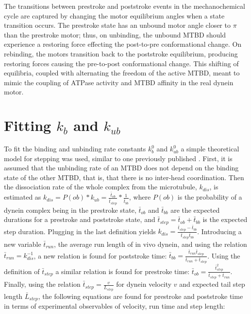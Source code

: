 \documentclass[9pt,twocolumn,twoside]{article}
\begin{document}
The transitions between prestroke and poststroke events in the mechanochemical cycle \cite{cianfrocco} are captured by changing the motor equilibrium angles when a state transition occurs. The prestroke state has an unbound motor angle closer to $\pi$ than the prestroke motor\cite{burgess-paper}; thus, on unbinding, the unbound MTBD should experience a restoring force effecting the post-to-pre conformational change. On rebinding, the motors transition back to the poststroke equilibrium, producing restoring forces causing the pre-to-post conformational change. This shifting of equilibria, coupled with alternating the freedom of the active MTBD, meant to mimic the coupling of ATPase activity and MTBD affinity in the real dynein motor.

\section*{Fitting $k_b$ and $k_{ub}$}
To fit the binding and unbinding rate constants $k^0_b$ and $k^0_{ub}$ a simple theoretical model for stepping was used, similar to one previously published \cite{myosindutyratio}. First, it is assumed that the unbinding rate of an MTBD does not depend on the binding state of the other MTBD, that is, that there is no inter-head coordination. Then the dissociation rate of the whole complex from the microtubule, $k_{dis}$, is estimated as $k_{dis} = P(ob)*k_{ub} = \frac{\bar{t}_{ob}}{\bar{t}_{step}} * \frac{1}{\bar{t}_{bb}}$, where $P(ob)$ is the probability of a dynein complex being in the prestroke state, $\bar{t}_{ob}$ and $\bar{t}_{bb}$ are the expected durations for a prestroke and poststroke state, and $\bar{t}_{step} = \bar{t}_{ob} + \bar{t}_{bb}$ is the expected step duration. Plugging in the last definition yields $k_{dis} = \frac{\bar{t}_{step} - \bar{t}_{bb}}{\bar{t}_{step}\bar{t}_{bb}}$. Introducing a new variable $\bar{t}_{run}$, the average run length of in vivo dynein, and using the relation $\bar{t}_{run} = k_{dis}^{-1}$, a new relation is found for poststroke time: $\bar{t}_{bb} = \frac{\bar{t}_{run}\bar{t}_{step}}{\bar{t}_{run}+\bar{t}_{step}}$. Using the definition of $\bar{t}_{step}$ a similar relation is found for prestroke time: $\bar{t}_{ob} = \frac{\bar{t}_{step}^2}{\bar{t}_{step}+\bar{t}_{run}}$. Finally, using the relation $\bar{t}_{step} = \frac{v}{L_{step}}$ for dynein velocity $v$ and expected tail step length $\bar{L}_{step}$, the following equations are found for prestroke and poststroke time in terms of experimental observables of velocity, run time and step length:
\end{document}
